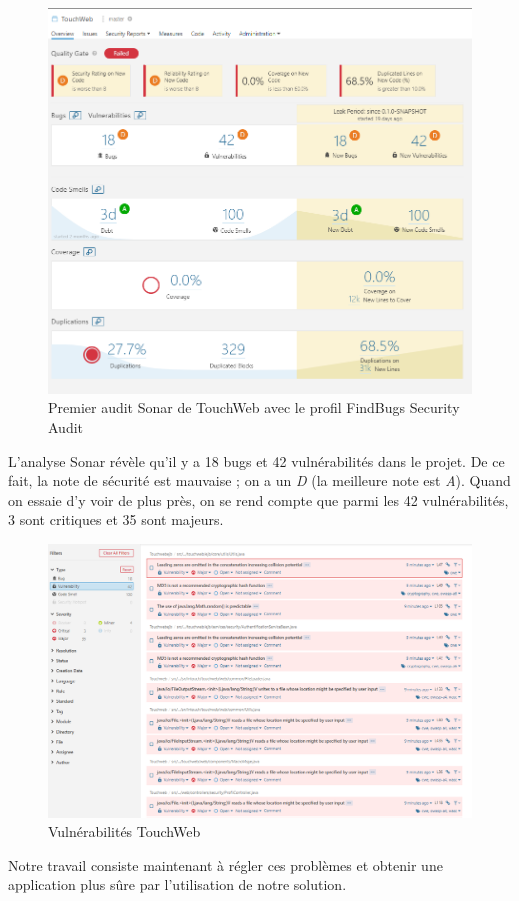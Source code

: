 \begin{figure}[H]
	\centering
	\begin{minipage}{12cm}
		\centering
		\includegraphics[width=1\textwidth]{fig/touchweb-first-sonar.PNG}
	\end{minipage}
	\caption{Premier audit Sonar de TouchWeb avec le profil FindBugs Security Audit}
	\label{fig:sddffds}
\end{figure}
L'analyse Sonar révèle qu'il y a 18 bugs et 42 vulnérabilités dans le projet. De ce fait, la note de sécurité est mauvaise ; on a un \textit{D} (la meilleure note est \textit{A}). Quand on essaie d'y voir de plus près, on se rend compte que parmi les 42 vulnérabilités, 3 sont critiques et 35 sont majeurs.
\begin{figure}[H]
	\centering
	\begin{minipage}{12cm}
		\centering
		\includegraphics[width=1\textwidth]{fig/touchweb-first-overview.PNG}
	\end{minipage}
	\caption{Vulnérabilités TouchWeb}
	\label{fig:sdfdsds}
\end{figure}
Notre travail consiste maintenant à régler ces problèmes et obtenir une application plus sûre par l'utilisation de notre solution.
